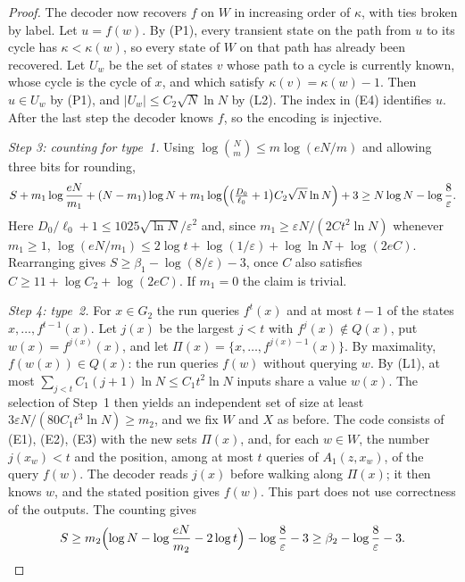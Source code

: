 \documentclass[11pt]{article}
\theoremstyle{definition}
\theoremstyle{remark}
\numberwithin{equation}{section}
\begin{document}
\begin{proof}
The decoder now recovers $f$ on $W$ in increasing order of $\kappa$, with
ties broken by label.  Let $u=f(w)$.  By (P1), every transient state on the
path from $u$ to its cycle has $\kappa<\kappa(w)$, so every state of $W$ on
that path has already been recovered.  Let $U_w$ be the set of states $v$
whose path to a cycle is currently known, whose cycle is the cycle of $x$,
and which satisfy $\kappa(v)=\kappa(w)-1$.  Then $u\in U_w$ by (P1), and
$|U_w|\leq C_2\sqrt N\ln N$ by (L2).  The index in (E4) identifies $u$.
After the last step the decoder knows $f$, so the encoding is injective.

\emph{Step 3: counting for type~1.}  Using
$\log\binom N{m}\leq m\log(eN/m)$ and allowing three bits for rounding,
\[
  S+m_1\log\frac{eN}{m_1}+(N-m_1)\log N
  +m_1\log\Bigl(\bigl(\tfrac{D_0}{\ell_0}+1\bigr)C_2\sqrt N\ln N\Bigr)+3
  \geq N\log N-\log\frac8\varepsilon.
\]
Here $D_0/\ell_0+1\leq1025\sqrt{\ln N}/\varepsilon^2$ and, since
$m_1\geq\varepsilon N/(2Ct^2\ln N)$ whenever $m_1\geq1$,
$\log(eN/m_1)\leq2\log t+\log(1/\varepsilon)+\log\ln N+\log(2eC)$.
Rearranging gives $S\geq\beta_1-\log(8/\varepsilon)-3$, once $C$ also
satisfies $C\geq11+\log C_2+\log(2eC)$.  If $m_1=0$ the claim is trivial.

\emph{Step 4: type~2.}  For $x\in G_2$ the run queries $f^t(x)$ and at
most $t-1$ of the states $x,\ldots,f^{t-1}(x)$.  Let $j(x)$ be the largest
$j<t$ with $f^j(x)\notin Q(x)$, put $w(x)=f^{j(x)}(x)$, and let
$\Pi(x)=\{x,\ldots,f^{j(x)-1}(x)\}$.  By maximality, $f(w(x))\in Q(x)$:
the run queries $f(w)$ without querying $w$.  By (L1), at most
$\sum_{j<t}C_1(j+1)\ln N\leq C_1t^2\ln N$ inputs share a value $w(x)$.
The selection of Step~1 then yields an independent set of size at least
$3\varepsilon N/(80C_1t^3\ln N)\geq m_2$, and we fix $W$ and $X$ as before.
The code consists of (E1), (E2), (E3) with the new sets $\Pi(x)$, and,
for each $w\in W$, the number $j(x_w)<t$ and the position, among at most
$t$ queries of $A_1(z,x_w)$, of the query $f(w)$.  The decoder reads
$j(x)$ before walking along $\Pi(x)$; it then knows $w$, and the stated
position gives $f(w)$.  This part does not use correctness of the
outputs.  The counting gives
\[
  S\geq m_2\Bigl(\log N-\log\frac{eN}{m_2}-2\log t\Bigr)
  -\log\frac8\varepsilon-3\geq\beta_2-\log\frac8\varepsilon-3.\qedhere
\]
\end{proof}
\end{document}

